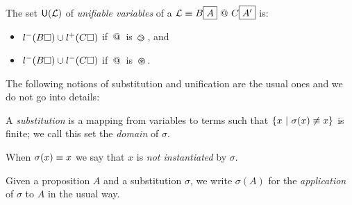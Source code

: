 \begin{definition}
\end{definition}


\begin{definition}\label{def:uvars}
  The set $\mathsf{U}(\mathcal{L})$ of {\em unifiable variables} of a 
  $\mathcal{L} \equiv B\fbox{$A$}\operatorname{\,@\,} C\fbox{$A'$}$ is:
  \begin{itemize}
  \item $l^-(B\square)\cup l^+(C\square)$ if $\operatorname{\,@\,}$ is $\operatorname{\,\varogreaterthan\,}$, and
  \item $l^-(B\square)\cup l^-(C\square)$ if $\operatorname{\,@\,}$ is $\operatorname{\,\varoast\,}$.
  \end{itemize}
\end{definition}

The following notions of substitution and unification are the usual ones and we
do not go into details:
 
\begin{definition}[Substitution]
  A \emph{substitution} is a mapping from variables to terms such that $\{x ~|~
  \sigma(x)\not\equiv x\}$ is finite; we call this set the {\em domain} of $\sigma$.

  When $\sigma(x)\equiv x$ we say that $x$ is  {\em not instantiated} by
  $\sigma$.
  
  
  Given a proposition $A$ and a substitution $\sigma$, we write
  $\sigma(A)$ for the \emph{application} of $\sigma$ to $A$ in the usual way.
\end{definition}

